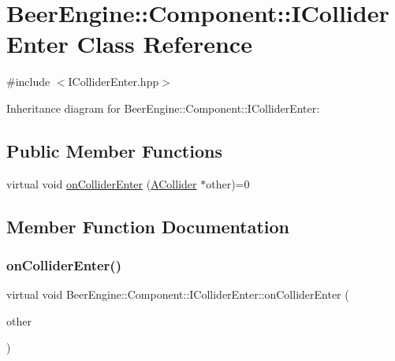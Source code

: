 \hypertarget{class_beer_engine_1_1_component_1_1_i_collider_enter}{}\section{Beer\+Engine\+:\+:Component\+:\+:I\+Collider\+Enter Class Reference}
\label{class_beer_engine_1_1_component_1_1_i_collider_enter}


{\ttfamily \#include $<$I\+Collider\+Enter.\+hpp$>$}



Inheritance diagram for Beer\+Engine\+:\+:Component\+:\+:I\+Collider\+Enter\+:
\subsection*{Public Member Functions}
\begin{DoxyCompactItemize}
\item 
virtual void \mbox{\hyperlink{class_beer_engine_1_1_component_1_1_i_collider_enter_a2b1d3e4210b12de57f70368a8a9b6686}{on\+Collider\+Enter}} (\mbox{\hyperlink{class_beer_engine_1_1_component_1_1_a_collider}{A\+Collider}} $\ast$other)=0
\end{DoxyCompactItemize}


\subsection{Member Function Documentation}
\mbox{\label{class_beer_engine_1_1_component_1_1_i_collider_enter_a2b1d3e4210b12de57f70368a8a9b6686}} 
\subsubsection{\texorpdfstring{on\+Collider\+Enter()}{onColliderEnter()}}
{\footnotesize\ttfamily virtual void Beer\+Engine\+::\+Component\+::\+I\+Collider\+Enter\+::on\+Collider\+Enter (\begin{DoxyParamCaption}\item[{\mbox{\hyperlink{class_beer_engine_1_1_component_1_1_a_collider}{A\+Collider}} $\ast$}]{other }\end{DoxyParamCaption})\hspace{0.3cm}{\ttfamily [pure virtual]}}



